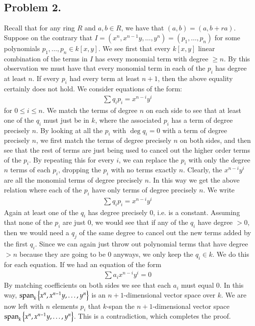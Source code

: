 \documentclass[12pt]{article}
\theoremstyle{definitionstyle}
\newcommand{\SET}[1]{\Set{\mskip-\medmuskip #1 \mskip-\medmuskip}}
\begin{document}
    \subsection*{Problem 2.}
    Recall that for any ring $R$ and $a, b \in R$, we have that $(a, b) = (a, b+ra)$. Suppose on the contrary that $I = (x^n, x^{n-1}y, \ldots, y^n) = (p_1, \ldots, p_n)$ for some polynomials $p_1, \ldots, p_n \in k[x,y]$. We see first that every $k[x,y]$ linear combination of the terms in $I$ has every monomial term with degree $\geq n$. By this observation we must have that every monomial term in each of the $p_i$ has degree at least $n$. If every $p_i$ had every term at least $n+1$, then the above equality certainly does not hold. We consider equations of the form:
    \begin{align*}
        \sum q_i p_i = x^{n-i}y^i
    \end{align*}
    for $0 \leq i \leq n$. We match the terms of degree $n$ on each side to see that at least one of the $q_i$ must just be in $k$, where the associated $p_i$ has a term of degree precisely $n$. By looking at all the $p_i$ with $\deg q_i = 0$ with a term of degree precisely $n$, we first match the terms of degree precisely $n$ on both sides, and then see that the rest of terms are just being used to cancel out the higher order terms of the $p_i$. By repeating this for every $i$, we can replace the $p_i$ with only the degree $n$ terms of each $p_i$, dropping the $p_i$ with no terms exactly $n$. Clearly, the $x^{n-i}y^i$ are all the monomial terms of degree precisely $n$. In this way we get the above relation where each of the $p_i$ have only terms of degree precisely $n$. We write
    \begin{align*}
        \sum q_i p_i = x^{n-i}y^i
    \end{align*}
    Again at least one of the $q_i$ has degree precisely 0, i.e. is a constant. Assuming that none of the $p_i$ are just 0, we would see that if any of the $q_i$ have degree $> 0$, then we would need a $q_j$ of the same degree to cancel out the new terms added by the first $q_i$. Since we can again just throw out polynomial terms that have degree $>n$ because they are going to be 0 anyways, we only keep the $q_i \in k$. We do this for each equation. If we had an equation of the form
    \begin{align*}
        \sum a_i x^{n-i}y^i = 0
    \end{align*}
    By matching coefficients on both sides we see that each $a_i$ must equal 0. In this way, $\mathrm{span}_k \SET{x^n, x^{n-1}y, \ldots, y^n}$ is an $n+1$-dimensional vector space over $k$. We are now left with $n$ elements $p_i$ that $k$-span the $n+1$-dimensional vector space $\mathrm{span}_k\SET{x^n, x^{n-1}y, \ldots, y^n}$. This is a contradiction, which completes the proof.
\end{document}
